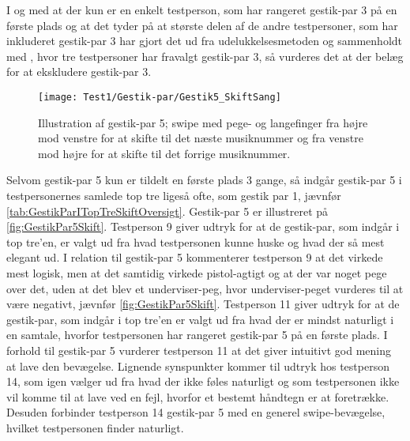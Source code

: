 I og med at der kun er en enkelt testperson, som har rangeret gestik-par 3 på en første plads og at det tyder på at største delen af de andre testpersoner, som har inkluderet gestik-par 3 har gjort det ud fra udelukkelsesmetoden og sammenholdt med , hvor tre testpersoner har fravalgt gestik-par 3, så vurderes det at der belæg for at ekskludere gestik-par 3.
%
\begin{figure}[H]
	\centering
	\texttt{[image: Test1/Gestik-par/Gestik5\_SkiftSang]}
	\caption{Illustration af gestik-par 5; swipe med pege- og langefinger fra højre mod venstre for at skifte til det næste musiknummer og fra venstre mod højre for at skifte til det forrige musiknummer.}
	\label{fig:GestikPar5Skift}
\end{figure}
\noindent
%
Selvom gestik-par 5 kun er tildelt en første plads 3 gange, så indgår gestik-par 5 i testpersonernes samlede top tre ligeså ofte, som gestik par 1, jævnfør \autoref{tab:GestikParITopTreSkiftOversigt}. Gestik-par 5 er illustreret på \autoref{fig:GestikPar5Skift}. Testperson 9 giver udtryk for at de gestik-par, som indgår i top tre'en, er valgt ud fra hvad testpersonen kunne huske og hvad der så mest elegant ud. I relation til gestik-par 5 kommenterer testperson 9 at det virkede mest logisk, men at det samtidig virkede pistol-agtigt og at der var noget pege over det, uden at det blev et underviser-peg, hvor underviser-peget vurderes til at være negativt, jævnfør \autoref{fig:GestikPar5Skift}. Testperson 11 giver udtryk for at de gestik-par, som indgår i top tre'en er valgt ud fra hvad der er mindst naturligt i en samtale, hvorfor testpersonen har rangeret gestik-par 5 på en første plads. I forhold til gestik-par 5 vurderer testperson 11 at det giver intuitivt god mening at lave den bevægelse. Lignende synspunkter kommer til udtryk hos testperson 14, som igen vælger ud fra hvad der ikke føles naturligt og som testpersonen ikke vil komme til at lave ved en fejl, hvorfor et bestemt håndtegn er at foretrække. Desuden forbinder testperson 14 gestik-par 5 med en generel swipe-bevægelse, hvilket testpersonen finder naturligt. 

